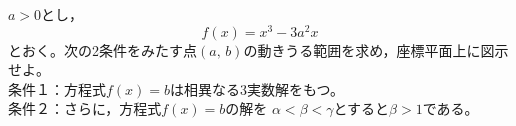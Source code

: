 \documentclass[../../main.tex]{subfiles}
\begin{document}
$a>0$とし，
\[ f(x)=x^3-3a^2x \]
とおく。次の2条件をみたす点$(a, \, b)$の動きうる範囲を求め，座標平面上に図示せよ。\\
条件１：方程式$f(x)=b$は相異なる3実数解をもつ。\\
条件２：さらに，方程式$f(x)=b$の解を
$\alpha<\beta<\gamma$とすると$\beta>1$である。
\end{document}
